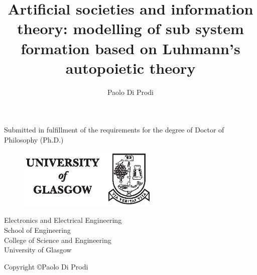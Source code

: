 \documentclass{book}
\title{Artificial societies and information theory: modelling of sub system formation based on Luhmann's autopoietic theory}
\author{Paolo Di Prodi}
\begin{document}
\makenomenclature

\maketitle


\begin{minipage}[center]{0.8\textwidth}
\begin{center}
Submitted in fulfillment of the requirements for
the degree of Doctor of Philosophy (Ph.D.)
\end{center}
\end{minipage}

\begin{figure}[h]
\begin{center}
\includegraphics[width=0.6\textwidth]{UnivLogo.eps} 
\end{center}
\end{figure} 


\begin{minipage}[center]{0.8\textwidth}
\begin{center}
Electronics and Electrical Engineering\\
School of Engineering\\
College of Science and Engineering\\
University of Glasgow\\
\end{center}
\end{minipage}

\vfill
\begin{minipage}[center]{0.8\textwidth}
\begin{center}
Copyright \copyright Paolo Di Prodi
\end{center}
\end{minipage}

\newpage
\end{document}

